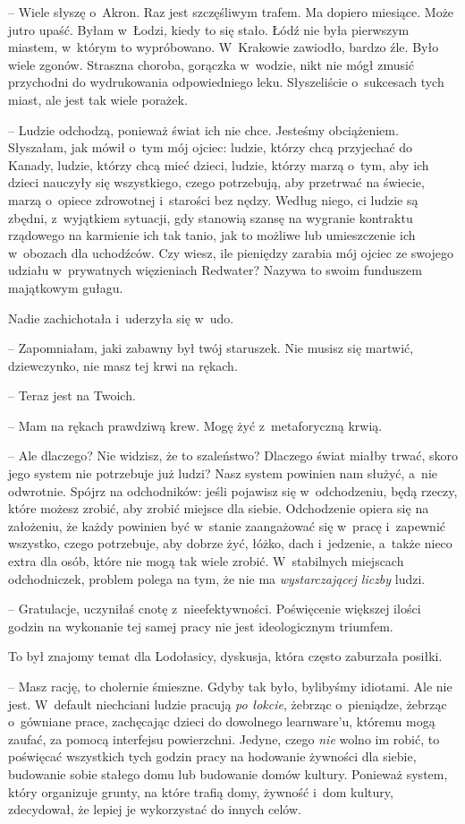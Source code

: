 \documentclass[oneside,polish,11pt,sfheadings]{mwbk}
\begin{document}
-- Wiele słyszę o~Akron. Raz jest szczęśliwym trafem. Ma dopiero
miesiące. Może jutro upaść. Byłam w~Łodzi, kiedy to się stało. Łódź nie
była pierwszym miastem, w~którym to wypróbowano. W~Krakowie zawiodło,
bardzo źle. Było wiele zgonów. Straszna choroba, gorączka w~wodzie, nikt
nie mógł zmusić przychodni do wydrukowania odpowiedniego leku.
Słyszeliście o~sukcesach tych miast, ale jest tak wiele porażek.

-- Ludzie odchodzą, ponieważ świat ich nie chce. Jesteśmy obciążeniem.
Słyszałam, jak mówił o~tym mój ojciec: ludzie, którzy chcą przyjechać do
Kanady, ludzie, którzy chcą mieć dzieci, ludzie, którzy marzą o~tym, aby
ich dzieci nauczyły się wszystkiego, czego potrzebują, aby przetrwać na
świecie, marzą o~opiece zdrowotnej i~starości bez nędzy. Według niego,
ci ludzie są zbędni, z~wyjątkiem sytuacji, gdy stanowią szansę na
wygranie kontraktu rządowego na karmienie ich tak tanio, jak to możliwe
lub umieszczenie ich w~obozach dla uchodźców. Czy wiesz, ile pieniędzy
zarabia mój ojciec ze swojego udziału w~prywatnych więzieniach Redwater?
Nazywa to swoim funduszem majątkowym gułagu.

Nadie zachichotała i~uderzyła się w~udo. 

-- Zapomniałam, jaki zabawny był
twój staruszek. Nie musisz się martwić, dziewczynko, nie masz tej krwi
na rękach.

-- Teraz jest na Twoich.

-- Mam na rękach prawdziwą krew. Mogę żyć z~metaforyczną krwią.

-- Ale dlaczego? Nie widzisz, że to szaleństwo? Dlaczego świat miałby
trwać, skoro jego system nie potrzebuje już ludzi? Nasz system powinien
nam służyć, a~nie odwrotnie. Spójrz na odchodników: jeśli pojawisz się w~odchodzeniu, będą rzeczy, które możesz zrobić, aby zrobić miejsce dla
siebie. Odchodzenie opiera się na założeniu, że każdy powinien być w~stanie zaangażować się w~pracę i~zapewnić wszystko, czego potrzebuje,
aby dobrze żyć, łóżko, dach i~jedzenie, a~także nieco extra dla osób,
które nie mogą tak wiele zrobić. W~stabilnych miejscach odchodniczek,
problem polega na tym, że nie ma \textit{wystarczającej liczby} ludzi.

-- Gratulacje, uczyniłaś cnotę z~nieefektywności. Poświęcenie większej
ilości godzin na wykonanie tej samej pracy nie jest ideologicznym
triumfem.

To był znajomy temat dla Lodołasicy, dyskusja, która często zaburzała
posiłki.

-- Masz rację, to cholernie śmieszne. Gdyby tak było, bylibyśmy idiotami.
Ale nie jest. W~default niechciani ludzie pracują \textit{po łokcie},
żebrząc o~pieniądze, żebrząc o~gówniane prace, zachęcając dzieci do
dowolnego learnware'u, któremu mogą zaufać, za pomocą interfejsu
powierzchni. Jedyne, czego \textit{nie} wolno im robić, to poświęcać
wszystkich tych godzin pracy na hodowanie żywności dla siebie, budowanie
sobie stałego domu lub budowanie domów kultury. Ponieważ system, który
organizuje grunty, na które trafią domy, żywność i~dom kultury,
zdecydował, że lepiej je wykorzystać do innych celów.
\end{document}
